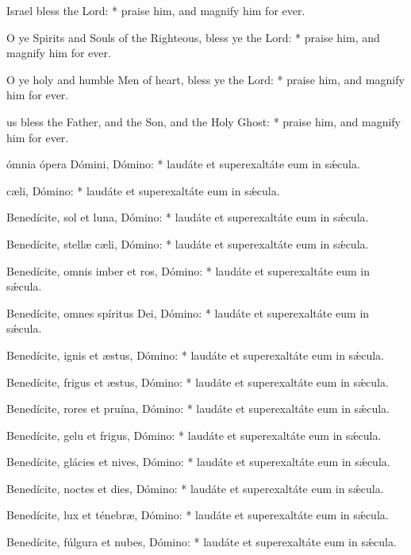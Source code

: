 { Israel bless the Lord: * praise him, and magnify him for ever.\par
{}
    O ye Spirits and Souls of the Righteous, bless ye the Lord: * praise him, and magnify him for ever.\par
    O ye holy and humble Men of heart, bless ye the Lord: * praise him, and magnify him for ever.

     us bless the Father, and the Son, and the Holy Ghost: * praise him, and magnify him for ever.
    }{
 ómnia ópera Dómini, Dómino: * laudáte et superexaltáte eum in sǽcula.\par
{}
 c{\ae}li, Dómino:  * laudáte et superexaltáte eum in sǽcula.\par
{}
Benedícite, sol et luna, Dómino: * laudáte et superexaltáte eum in sǽcula.\par
Benedícite, stell{\ae} c{\ae}li, Dómino: * laudáte et superexaltáte eum in sǽcula.\par
Benedícite, omnis imber et ros, Dómino: * laudáte et superexaltáte eum in sǽcula.\par
Benedícite, omnes spíritus Dei, Dómino: * laudáte et superexaltáte eum in sǽcula.\par
Benedícite, ignis et {\ae}stus, Dómino: * laudáte et superexaltáte eum in sǽcula.\par
Benedícite, frigus et {\ae}stus, Dómino: * laudáte et superexaltáte eum in sǽcula.\par
Benedícite, rores et pruína, Dómino: * laudáte et superexaltáte eum in sǽcula.\par
Benedícite, gelu et frigus, Dómino: * laudáte et superexaltáte eum in sǽcula.\par
Benedícite, glácies et nives, Dómino: * laudáte et superexaltáte eum in sǽcula.\par
Benedícite, noctes et dies, Dómino: * laudáte et superexaltáte eum in sǽcula.\par
Benedícite, lux et ténebr{\ae}, Dómino: * laudáte et superexaltáte eum in sǽcula.\par
Benedícite, fúlgura et nubes, Dómino: * laudáte et superexaltáte eum in sǽcula.\par

}
